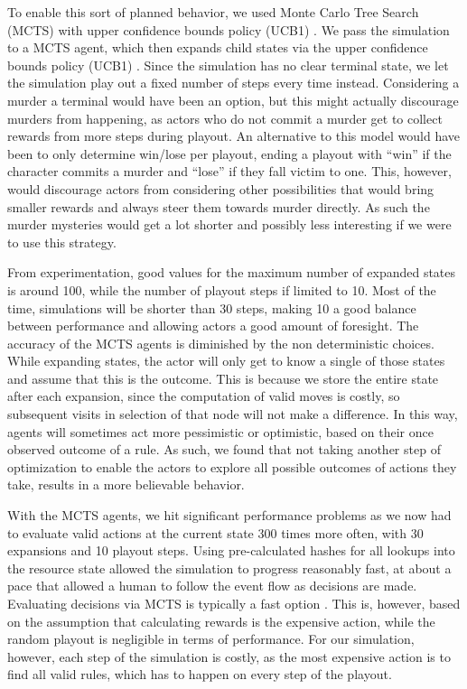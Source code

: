 To enable this sort of planned behavior, we used Monte Carlo Tree Search (MCTS) with upper confidence bounds policy (UCB1) \cite{Auer2002}.
We pass the simulation to a MCTS agent, which then expands child states via the upper confidence bounds policy (UCB1)  .
Since the simulation has no clear terminal state, we let the simulation play out a fixed number of steps every time instead.
Considering a murder a terminal would have been an option, but this might actually discourage murders from happening, as actors who do not commit a murder get to collect rewards from more steps during playout.
An alternative to this model would have been to only determine win/lose per playout, ending a playout with \enquote{win} if the character commits a murder and \enquote{lose} if they fall victim to one.
This, however, would discourage actors from considering other possibilities that would bring smaller rewards and always steer them towards murder directly.
As such the murder mysteries would get a lot shorter and possibly less interesting if we were to use this strategy.

From experimentation, good values for the maximum number of expanded states is around 100, while the number of playout steps if limited to 10.
Most of the time, simulations will be shorter than 30 steps, making 10 a good balance between performance and allowing actors a good amount of foresight.
The accuracy of the MCTS agents is diminished by the non deterministic choices.
While expanding states, the actor will only get to know a single of those states and assume that this is the outcome.
This is because we store the entire state after each expansion, since the computation of valid moves is costly, so subsequent visits in selection of that node will not make a difference.
In this way, agents will sometimes act more pessimistic or optimistic, based on their once observed outcome of a rule.
As such, we found that not taking another step of optimization to enable the actors to explore all possible outcomes of actions they take, results in a more believable behavior.

With the MCTS agents, we hit significant performance problems as we now had to evaluate valid actions at the current state 300 times more often, with 30 expansions and 10 playout steps. Using pre-calculated hashes for all lookups into the resource state allowed the simulation to progress reasonably fast, at about a pace that allowed a human to follow the event flow as decisions are made. Evaluating decisions via MCTS is typically a fast option \cite{mcts_survey}. This is, however, based on the assumption that calculating rewards is the expensive action, while the random playout is negligible in terms of performance. For our simulation, however, each step of the simulation is costly, as the most expensive action is to find all valid rules, which has to happen on every step of the playout.

